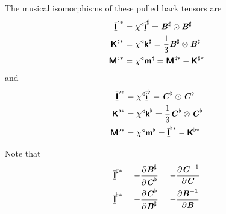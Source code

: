 The musical isomorphisms of these pulled back tensors are
\begin{align}
    \overline{\underline{\boldsymbol{\mathsf{ I }}}}  ^{\sharp *}&= \chi^{\triangleleft}   \overline{\underline{\boldsymbol{\mathsf{ i }}}}  ^{\sharp}  =  \boldsymbol{\mathit{B}}^{\sharp}  \odot  \boldsymbol{\mathit{B}}^{\sharp}  \\
    \boldsymbol{\mathsf{ K }}  ^{\sharp *}&= \chi^{\triangleleft}   \boldsymbol{\mathsf{ k }}  ^{\sharp}  =\dfrac{1}{3}  \boldsymbol{\mathit{B}}^{\sharp}  \otimes  \boldsymbol{\mathit{B}}^{\sharp}  \\
    \boldsymbol{\mathsf{ M }}  ^{\sharp
    *}&= \chi^{\triangleleft}   \boldsymbol{\mathsf{ m }}  ^{\sharp}  =  \boldsymbol{\mathsf{ M }}  ^{\sharp *}-  \boldsymbol{\mathsf{ K }}  ^{\sharp *}
\end{align}
and
\begin{align}
    \overline{\underline{\boldsymbol{\mathsf{ I }}}}  ^{\flat *}&= \chi^{\triangleleft}  \overline{\underline{\boldsymbol{\mathsf{ i }}}}  ^{\flat} = \boldsymbol{\mathit{C}}^{\flat} \odot \boldsymbol{\mathit{C}}^{\flat} \\
    \boldsymbol{\mathsf{ K }}  ^{\flat *}&= \chi^{\triangleleft}  \boldsymbol{\mathsf{ k }}  ^{\flat} =\dfrac{1}{3} \boldsymbol{\mathit{C}}^{\flat} \otimes \boldsymbol{\mathit{C}}^{\flat} \\
    \boldsymbol{\mathsf{ M }}  ^{\flat
    *}&= \chi^{\triangleleft}  \boldsymbol{\mathsf{ m }}  ^{\flat} =  \overline{\underline{\boldsymbol{\mathsf{ I }}}}  ^{\flat
    *}-  \boldsymbol{\mathsf{ K }}  ^{\flat *}
\end{align}

Note that
\begin{align}
    \overline{\underline{\boldsymbol{\mathsf{ I }}}}  ^{\sharp
    *}&=- \dfrac{\partial  \boldsymbol{\mathit{B}}^{\sharp} }{\partial \boldsymbol{\mathit{C}}^{\flat}} =- \dfrac{\partial {\ensuremath{\boldsymbol{\mathit{C}}}}^{-1}}{\partial \boldsymbol{\mathit{C}}}  \\
    \overline{\underline{\boldsymbol{\mathsf{ I }}}}  ^{\flat
    *}&=- \dfrac{\partial \boldsymbol{\mathit{C}}^{\flat}}{\partial  \boldsymbol{\mathit{B}}^{\sharp} } =- \dfrac{\partial {\ensuremath{\boldsymbol{\mathit{B}}}}^{-1}}{\partial \boldsymbol{\mathit{B}}}  \\
\end{align}

